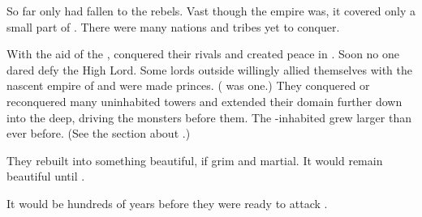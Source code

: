 So far only \Merkyrah had fallen to the rebels. 
Vast though the empire was, it covered only a small part of \Nyx. 
There were many nations and tribes yet to conquer.

With the aid of the \banelords, \CiriathSepher conquered their rivals and created peace in \Nyx.
Soon no one dared defy the High Lord. 
Some lords outside \Merkyrah willingly allied themselves with the nascent empire of \CiriathSepher and were made princes. 
( was one.)
They conquered or reconquered many uninhabited towers and extended their domain further down into the deep, driving the monsters before them. 
The \resphan-inhabited \Nyx grew larger than ever before.
(See the section about .)

They rebuilt \Nyx into something beautiful, if grim and martial. 
It would remain beautiful until . 

It would be hundreds of years before they were ready to attack \Tembrae. 























